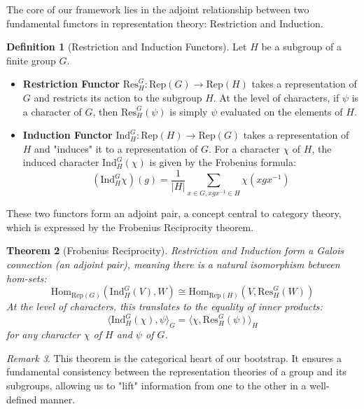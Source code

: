 \documentclass[11pt]{article}
\newtheorem{theorem}{Theorem}[section]
\theoremstyle{definition}
\newtheorem{definition}[theorem]{Definition}
\theoremstyle{remark}
\newtheorem{remark}[theorem]{Remark}
\begin{document}
The core of our framework lies in the adjoint relationship between two fundamental functors in representation theory: Restriction and Induction.

\begin{definition}[Restriction and Induction Functors]\label{def:restriction_induction_functors}
Let $H$ be a subgroup of a finite group $G$.
\begin{itemize}
    \item \textbf{Restriction Functor} $\text{Res}^G_H: \text{Rep}(G) \to \text{Rep}(H)$ takes a representation of $G$ and restricts its action to the subgroup $H$. At the level of characters, if $\psi$ is a character of $G$, then $\text{Res}^G_H(\psi)$ is simply $\psi$ evaluated on the elements of $H$.
    \item \textbf{Induction Functor} $\text{Ind}^G_H: \text{Rep}(H) \to \text{Rep}(G)$ takes a representation of $H$ and "induces" it to a representation of $G$. For a character $\chi$ of $H$, the induced character $\text{Ind}^G_H(\chi)$ is given by the Frobenius formula:
    \begin{equation}
    (\text{Ind}^G_H \chi)(g) = \frac{1}{|H|} \sum_{x \in G, xgx^{-1} \in H} \chi(xgx^{-1})
    \end{equation}
\end{itemize}
\end{definition}

These two functors form an adjoint pair, a concept central to category theory, which is expressed by the Frobenius Reciprocity theorem.

\begin{theorem}[Frobenius Reciprocity]\label{thm:frobenius_reciprocity}
Restriction and Induction form a Galois connection (an adjoint pair), meaning there is a natural isomorphism between hom-sets:
\begin{equation}
\text{Hom}_{\text{Rep}(G)}(\text{Ind}^G_H(V), W) \cong \text{Hom}_{\text{Rep}(H)}(V, \text{Res}^G_H(W))
\end{equation}
At the level of characters, this translates to the equality of inner products:
\begin{equation}
\langle \text{Ind}^G_H(\chi), \psi \rangle_G = \langle \chi, \text{Res}^G_H(\psi) \rangle_H
\end{equation}
for any character $\chi$ of $H$ and $\psi$ of $G$.
\end{theorem}
\begin{remark}
This theorem is the categorical heart of our bootstrap. It ensures a fundamental consistency between the representation theories of a group and its subgroups, allowing us to "lift" information from one to the other in a well-defined manner.
\end{remark}
\end{document}

